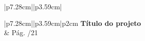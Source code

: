 {\begin{tabular}{|p{7.28cm}||p{3.59cm}|}
    \begin{tabular}{|p{7.28cm}||p{3.59cm}|p{2cm}} 
         {\fontsize{8}{10}\selectfont \textbf{Título do projeto}} \\
    
         {\fontsize{8}{10}\selectfont  \Titulodoprojeto} &
        \fontsize{8}{9}\selectfont Pág. \thepage /21 %
        \\ \hline %
    \end{tabular} 
\end{tabular}} 

